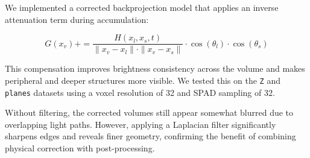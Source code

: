 \documentclass[a4paper,10pt]{article}
\begin{document}
We implemented a corrected backprojection model that applies an inverse attenuation term during accumulation:

\[
G(x_v) += \frac{H(x_l, x_s, t)}{\|x_v - x_l\| \cdot \|x_v - x_s\|} \cdot \cos(\theta_l) \cdot \cos(\theta_s)
\]

This compensation improves brightness consistency across the volume and makes peripheral and deeper structures more visible. We tested this on the \texttt{Z} and \texttt{planes} datasets using a voxel resolution of 32 and SPAD sampling of 32.

Without filtering, the corrected volumes still appear somewhat blurred due to overlapping light paths. However, applying a Laplacian filter significantly sharpens edges and reveals finer geometry, confirming the benefit of combining physical correction with post-processing.


\end{document}
